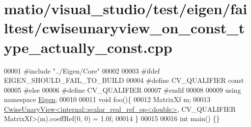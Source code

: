 \hypertarget{matio_2visual__studio_2test_2eigen_2failtest_2cwiseunaryview__on__const__type__actually__const_8cpp_source}{}\section{matio/visual\+\_\+studio/test/eigen/failtest/cwiseunaryview\+\_\+on\+\_\+const\+\_\+type\+\_\+actually\+\_\+const.cpp}
\label{matio_2visual__studio_2test_2eigen_2failtest_2cwiseunaryview__on__const__type__actually__const_8cpp_source}

\begin{DoxyCode}
00001 \textcolor{preprocessor}{#include "../Eigen/Core"}
00002 
00003 \textcolor{preprocessor}{#ifdef EIGEN\_SHOULD\_FAIL\_TO\_BUILD}
00004 \textcolor{preprocessor}{#define CV\_QUALIFIER const}
00005 \textcolor{preprocessor}{#else}
00006 \textcolor{preprocessor}{#define CV\_QUALIFIER}
00007 \textcolor{preprocessor}{#endif}
00008 
00009 \textcolor{keyword}{using namespace }\hyperlink{namespace_eigen}{Eigen};
00010 
00011 \textcolor{keywordtype}{void} foo()\{
00012     MatrixXf m;
00013     \hyperlink{group___core___module_class_eigen_1_1_cwise_unary_view}{CwiseUnaryView<internal::scalar\_real\_ref\_op<double>},
      CV\_QUALIFIER MatrixXf>(m).coeffRef(0, 0) = 1.0f;
00014 \}
00015 
00016 \textcolor{keywordtype}{int} main() \{\}
\end{DoxyCode}
